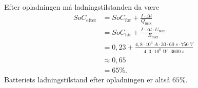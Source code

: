 \documentclass{report}
\begin{document}
Efter opladningen må ladningstilstanden da være
\begin{equation*}
\begin{split}
  SoC _{\text{efter} }&=SoC _{\text{før} } + \frac{I \cdot \Delta t}{Q _{\text{max} }}\\
  &=SoC _{\text{før} } + \frac{I \cdot \Delta t \cdot U _{\text{nom} }}{E _{\text{max} }}\\
  &=0,23 + \frac{4,8 \cdot 10^3 \;\unit{A} \cdot 30 \cdot 60 \;\unit{s} \cdot 750 \;\unit{V} }{4,3 \cdot 10^6 \;\unit{W} \cdot 3600 \;\unit{s} }\\
  &\approx 0,65\\
  &= 65 \%.
\end{split}
\end{equation*}
Batteriets ladningstilstand efter opladningen er altså $65 \%$.
\end{document}
